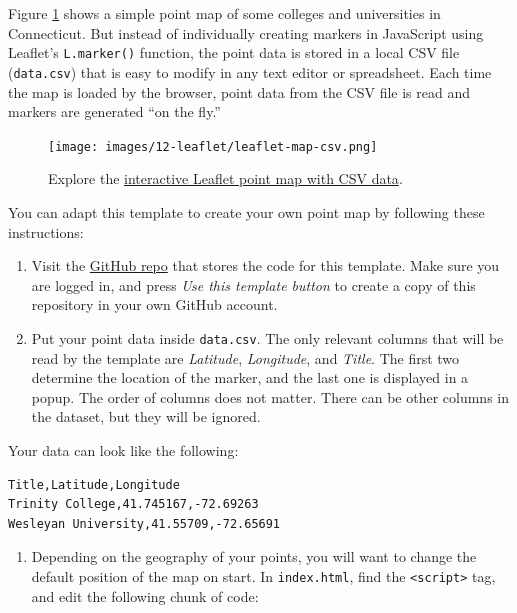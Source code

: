 \documentclass[
  english,
]{book}
\providecommand{\tightlist}{%
  \setlength{\itemsep}{0pt}\setlength{\parskip}{0pt}}
\begin{document}
Figure \ref{fig:leaflet-map-csv} shows a simple point map of some colleges and universities
in Connecticut. But instead of individually creating markers in JavaScript using Leaflet's \texttt{L.marker()} function, the point data is stored in a local CSV file (\texttt{data.csv}) that is easy
to modify in any text editor or spreadsheet. Each time the map is loaded by the browser,
point data from the CSV file is read and markers are generated ``on the fly.''



\begin{figure}
\centering
\texttt{[image: images/12-leaflet/leaflet-map-csv.png]}
\caption{\label{fig:leaflet-map-csv}Explore the \href{https://handsondataviz.github.io/leaflet-map-csv/}{interactive Leaflet point map with CSV data}.}
\end{figure}

You can adapt this template to create your own point map by following these instructions:

\begin{enumerate}
\def\labelenumi{\arabic{enumi}.}
\tightlist
\item
  Visit the \href{https://github.com/HandsOnDataViz/leaflet-map-csv}{GitHub repo} that stores the code for this template. Make sure you are logged in, and
  press \emph{Use this template button} to create a copy of this repository in your own GitHub account.
\item
  Put your point data inside \texttt{data.csv}. The only relevant columns that will be read by the template are \emph{Latitude}, \emph{Longitude}, and \emph{Title}.
  The first two determine the location of the marker, and the last one is displayed in a popup. The order of columns does not matter. There can be other columns in the dataset,
  but they will be ignored.
\end{enumerate}

Your data can look like the following:

\begin{verbatim}
Title,Latitude,Longitude
Trinity College,41.745167,-72.69263
Wesleyan University,41.55709,-72.65691
\end{verbatim}

\begin{enumerate}
\def\labelenumi{\arabic{enumi}.}
\setcounter{enumi}{2}
\tightlist
\item
  Depending on the geography of your points, you will want to change the default position
  of the map on start. In \texttt{index.html}, find the \texttt{\textless{}script\textgreater{}} tag, and edit the following
  chunk of code:
\end{enumerate}
\end{document}
